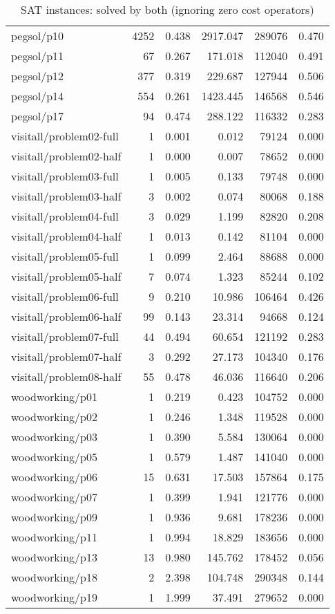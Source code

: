 \begin{table*}[ht]
\begin{tabular}{lrrrrr}
  pegsol/p10 & 4252 & 0.438 & 2917.047 & 289076 & 0.470 \\ 
  pegsol/p11 &   67 & 0.267 & 171.018 & 112040 & 0.491 \\ 
  pegsol/p12 &  377 & 0.319 & 229.687 & 127944 & 0.506 \\ 
  pegsol/p14 &  554 & 0.261 & 1423.445 & 146568 & 0.546 \\ 
  pegsol/p17 &   94 & 0.474 & 288.122 & 116332 & 0.283 \\ 
  visitall/problem02-full &    1 & 0.001 & 0.012 & 79124 & 0.000 \\ 
  visitall/problem02-half &    1 & 0.000 & 0.007 & 78652 & 0.000 \\ 
  visitall/problem03-full &    1 & 0.005 & 0.133 & 79748 & 0.000 \\ 
  visitall/problem03-half &    3 & 0.002 & 0.074 & 80068 & 0.188 \\ 
  visitall/problem04-full &    3 & 0.029 & 1.199 & 82820 & 0.208 \\ 
  visitall/problem04-half &    1 & 0.013 & 0.142 & 81104 & 0.000 \\ 
  visitall/problem05-full &    1 & 0.099 & 2.464 & 88688 & 0.000 \\ 
  visitall/problem05-half &    7 & 0.074 & 1.323 & 85244 & 0.102 \\ 
  visitall/problem06-full &    9 & 0.210 & 10.986 & 106464 & 0.426 \\ 
  visitall/problem06-half &   99 & 0.143 & 23.314 & 94668 & 0.124 \\ 
  visitall/problem07-full &   44 & 0.494 & 60.654 & 121192 & 0.283 \\ 
  visitall/problem07-half &    3 & 0.292 & 27.173 & 104340 & 0.176 \\ 
  visitall/problem08-half &   55 & 0.478 & 46.036 & 116640 & 0.206 \\ 
  woodworking/p01 &    1 & 0.219 & 0.423 & 104752 & 0.000 \\ 
  woodworking/p02 &    1 & 0.246 & 1.348 & 119528 & 0.000 \\ 
  woodworking/p03 &    1 & 0.390 & 5.584 & 130064 & 0.000 \\ 
  woodworking/p05 &    1 & 0.579 & 1.487 & 141040 & 0.000 \\ 
  woodworking/p06 &   15 & 0.631 & 17.503 & 157864 & 0.175 \\ 
  woodworking/p07 &    1 & 0.399 & 1.941 & 121776 & 0.000 \\ 
  woodworking/p09 &    1 & 0.936 & 9.681 & 178236 & 0.000 \\ 
  woodworking/p11 &    1 & 0.994 & 18.829 & 183656 & 0.000 \\ 
  woodworking/p13 &   13 & 0.980 & 145.762 & 178452 & 0.056 \\ 
  woodworking/p18 &    2 & 2.398 & 104.748 & 290348 & 0.144 \\ 
  woodworking/p19 &    1 & 1.999 & 37.491 & 279652 & 0.000 \\ 
   \hline
\end{tabular}
\caption{SAT instances: solved by both (ignoring zero cost operators)} 
\label{tab:sat_both}
\end{table*}
